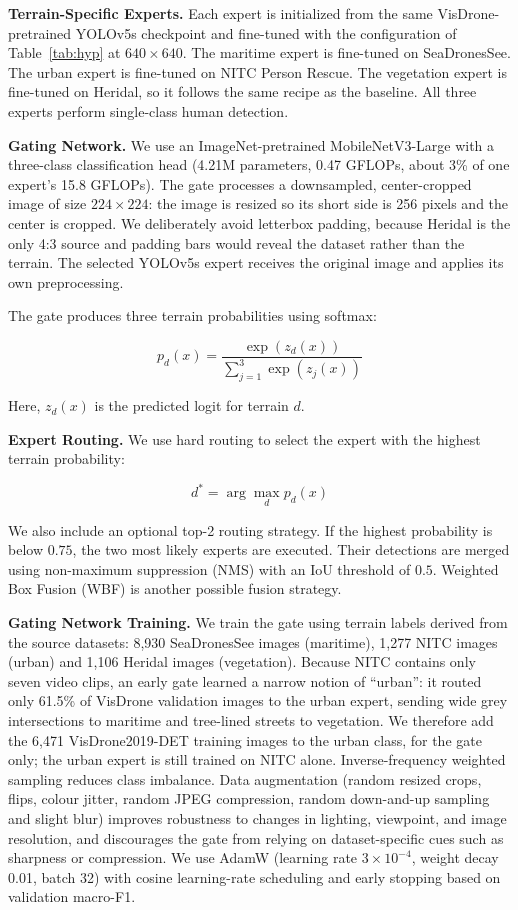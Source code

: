 \documentclass{article}
\begin{document}
\textbf{Terrain-Specific Experts.}
Each expert is initialized from the same VisDrone-pretrained YOLOv5s checkpoint and fine-tuned with the configuration of Table~\ref{tab:hyp} at $640\times640$. The maritime expert is fine-tuned on SeaDronesSee. The urban expert is fine-tuned on NITC Person Rescue. The vegetation expert is fine-tuned on Heridal, so it follows the same recipe as the baseline. All three experts perform single-class human detection.

\textbf{Gating Network.}
We use an ImageNet-pretrained MobileNetV3-Large with a three-class classification head (4.21M parameters, 0.47 GFLOPs, about 3\% of one expert's 15.8 GFLOPs). The gate processes a downsampled, center-cropped image of size $224 \times 224$: the image is resized so its short side is 256 pixels and the center is cropped. We deliberately avoid letterbox padding, because Heridal is the only 4:3 source and padding bars would reveal the dataset rather than the terrain. The selected YOLOv5s expert receives the original image and applies its own preprocessing.

The gate produces three terrain probabilities using softmax:

\begin{equation}
p_d(x) = \frac{\exp(z_d(x))}
{\sum_{j=1}^{3}\exp(z_j(x))}
\end{equation}

Here, $z_d(x)$ is the predicted logit for terrain $d$.

\textbf{Expert Routing.}
We use hard routing to select the expert with the highest terrain probability:

\begin{equation}
d^* = \arg\max_d p_d(x)
\end{equation}

We also include an optional top-2 routing strategy. If the highest probability is below $0.75$, the two most likely experts are executed. Their detections are merged using non-maximum suppression (NMS) with an IoU threshold of $0.5$. Weighted Box Fusion (WBF) is another possible fusion strategy.

\textbf{Gating Network Training.}
We train the gate using terrain labels derived from the source datasets: 8,930 SeaDronesSee images (maritime), 1,277 NITC images (urban) and 1,106 Heridal images (vegetation). Because NITC contains only seven video clips, an early gate learned a narrow notion of ``urban'': it routed only 61.5\% of VisDrone validation images to the urban expert, sending wide grey intersections to maritime and tree-lined streets to vegetation. We therefore add the 6,471 VisDrone2019-DET training images to the urban class, for the gate only; the urban expert is still trained on NITC alone. Inverse-frequency weighted sampling reduces class imbalance. Data augmentation (random resized crops, flips, colour jitter, random JPEG compression, random down-and-up sampling and slight blur) improves robustness to changes in lighting, viewpoint, and image resolution, and discourages the gate from relying on dataset-specific cues such as sharpness or compression. We use AdamW (learning rate $3\times10^{-4}$, weight decay 0.01, batch 32) with cosine learning-rate scheduling and early stopping based on validation macro-F1.
\end{document}
